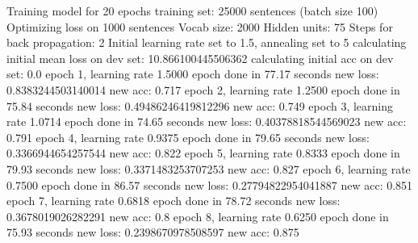 Training model for 20 epochs
training set: 25000 sentences (batch size 100)
Optimizing loss on 1000 sentences
Vocab size: 2000
Hidden units: 75
Steps for back propagation: 2
Initial learning rate set to 1.5, annealing set to 5
calculating initial mean loss on dev set: 10.866100445506362
calculating initial acc on dev set: 0.0
epoch 1, learning rate 1.5000	epoch done in 77.17 seconds	new loss: 0.8383244503140014	new acc: 0.717
epoch 2, learning rate 1.2500	epoch done in 75.84 seconds	new loss: 0.49486246419812296	new acc: 0.749
epoch 3, learning rate 1.0714	epoch done in 74.65 seconds	new loss: 0.40378818544569023	new acc: 0.791
epoch 4, learning rate 0.9375	epoch done in 79.65 seconds	new loss: 0.3366944654257544	new acc: 0.822
epoch 5, learning rate 0.8333	epoch done in 79.93 seconds	new loss: 0.3371483253707253	new acc: 0.827
epoch 6, learning rate 0.7500	epoch done in 86.57 seconds	new loss: 0.27794822954041887	new acc: 0.851
epoch 7, learning rate 0.6818	epoch done in 78.72 seconds	new loss: 0.3678019026282291	new acc: 0.8
epoch 8, learning rate 0.6250	epoch done in 75.93 seconds	new loss: 0.2398670978508597	new acc: 0.875

